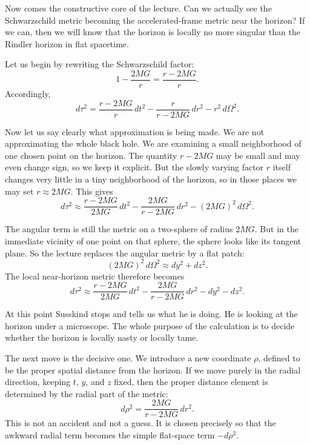 Now comes the constructive core of the lecture. Can we actually see the Schwarzschild metric becoming the accelerated-frame metric near the horizon? If we can, then we will know that the horizon is locally no more singular than the Rindler horizon in flat spacetime.

Let us begin by rewriting the Schwarzschild factor:
\begin{equation}
1-\frac{2MG}{r}=\frac{r-2MG}{r}.
\end{equation}
Accordingly,
\begin{equation}
d\tau^2
=
\frac{r-2MG}{r}\,dt^2
-
\frac{r}{r-2MG}\,dr^2
-
r^2\,d\Omega^2.
\end{equation}

Now let us say clearly what approximation is being made. We are not approximating the whole black hole. We are examining a small neighborhood of one chosen point on the horizon. The quantity \(r-2MG\) may be small and may even change sign, so we keep it explicit. But the slowly varying factor \(r\) itself changes very little in a tiny neighborhood of the horizon, so in those places we may set \(r\approx 2MG\). This gives
\begin{equation}
d\tau^2
\approx
\frac{r-2MG}{2MG}\,dt^2
-
\frac{2MG}{r-2MG}\,dr^2
-
(2MG)^2\,d\Omega^2.
\end{equation}

The angular term is still the metric on a two-sphere of radius \(2MG\). But in the immediate vicinity of one point on that sphere, the sphere looks like its tangent plane. So the lecture replaces the angular metric by a flat patch:
\begin{equation}
(2MG)^2\,d\Omega^2 \approx dy^2+dz^2.
\end{equation}
The local near-horizon metric therefore becomes
\begin{equation}
d\tau^2
\approx
\frac{r-2MG}{2MG}\,dt^2
-
\frac{2MG}{r-2MG}\,dr^2
-
dy^2
-
dz^2.
\end{equation}

At this point Susskind stops and tells us what he is doing. He is looking at the horizon under a microscope. The whole purpose of the calculation is to decide whether the horizon is locally nasty or locally tame.

The next move is the decisive one. We introduce a new coordinate \(\rho\), defined to be the proper spatial distance from the horizon. If we move purely in the radial direction, keeping \(t\), \(y\), and \(z\) fixed, then the proper distance element is determined by the radial part of the metric:
\begin{equation}
d\rho^2=\frac{2MG}{r-2MG}\,dr^2.
\end{equation}
This is not an accident and not a guess. It is chosen precisely so that the awkward radial term becomes the simple flat-space term \(-d\rho^2\).

